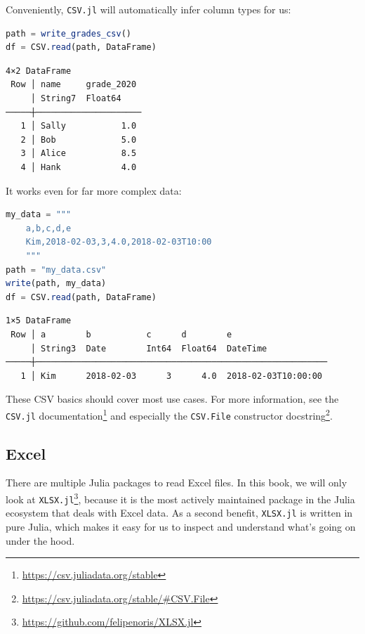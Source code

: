 \documentclass[
  notoc %
]{tufte-book}
\DeclareRobustCommand{\href}[2]{#2\footnote{\url{#1}}}
\newcommand{\passthrough}[1]{#1}
\begin{document}
Conveniently, \passthrough{\lstinline!CSV.jl!} will automatically infer
column types for us:

\begin{lstlisting}[language=Julia]
path = write_grades_csv()
df = CSV.read(path, DataFrame)
\end{lstlisting}

\begin{lstlisting}[language=Output]
4×2 DataFrame
 Row │ name     grade_2020
     │ String7  Float64
─────┼─────────────────────
   1 │ Sally           1.0
   2 │ Bob             5.0
   3 │ Alice           8.5
   4 │ Hank            4.0
\end{lstlisting}

It works even for far more complex data:

\begin{lstlisting}[language=Julia]
my_data = """
    a,b,c,d,e
    Kim,2018-02-03,3,4.0,2018-02-03T10:00
    """
path = "my_data.csv"
write(path, my_data)
df = CSV.read(path, DataFrame)
\end{lstlisting}

\begin{lstlisting}[language=Output]
1×5 DataFrame
 Row │ a        b           c      d        e
     │ String3  Date        Int64  Float64  DateTime
─────┼──────────────────────────────────────────────────────────
   1 │ Kim      2018-02-03      3      4.0  2018-02-03T10:00:00
\end{lstlisting}

These CSV basics should cover most use cases. For more information, see
the
\href{https://csv.juliadata.org/stable}{\passthrough{\lstinline!CSV.jl!}
documentation} and especially the
\href{https://csv.juliadata.org/stable/\#CSV.File}{\passthrough{\lstinline!CSV.File!}
constructor docstring}.

\hypertarget{sec:excel}{%
\subsection{Excel}\label{sec:excel}}

There are multiple Julia packages to read Excel files. In this book, we
will only look at
\href{https://github.com/felipenoris/XLSX.jl}{\passthrough{\lstinline!XLSX.jl!}},
because it is the most actively maintained package in the Julia
ecosystem that deals with Excel data. As a second benefit,
\passthrough{\lstinline!XLSX.jl!} is written in pure Julia, which makes
it easy for us to inspect and understand what's going on under the hood.
\end{document}

